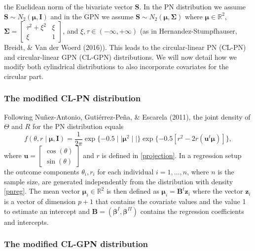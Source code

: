 \documentclass[12pt,]{article}
\DeclareRobustCommand{\VANDER}[3]{#2}
\begin{document}
the Euclidean norm of the bivariate vector \(\boldsymbol{S}\). In the PN
distribution we assume
\(\boldsymbol{S} \sim N_2(\boldsymbol{\mu}, \boldsymbol{I})\) and in the
GPN we assume
\(\boldsymbol{S} \sim N_2(\boldsymbol{\mu}, \boldsymbol{\Sigma})\) where
\(\boldsymbol{\mu} \in \mathbb{R}^2\),
\(\boldsymbol{\Sigma} = \begin{bmatrix} \tau^2 + \xi^2 & \xi\\ \xi & 1 \end{bmatrix}\),
and \(\xi,\tau \in (-\infty, +\infty)\) (as in Hernandez-Stumpfhauser,
Breidt, \& \VANDER{Woerd}{Van der}{van der} Woerd (2016)). This leads to
the circular-linear PN (CL-PN) and circular-linear GPN (CL-GPN)
distributions. We will now detail how we modify both cylindrical
distributions to also incorporate covariates for the circular part.

\subsubsection{The modified CL-PN distribution}

Following Nuñez-Antonio, Gutiérrez-Peña, \& Escarela (2011), the joint
density of \(\Theta\) and \(R\) for the PN distribution equals
\begin{equation}\label{pnreg}
f(\theta,r \mid \boldsymbol{\mu}, \boldsymbol{I}) = \frac{1}{2\pi} \exp\{-0.5 \mid\mid\boldsymbol{\mu}^2\mid\mid\}\exp\{-0.5\left[r^2 -2r(\boldsymbol{u}^t\boldsymbol{\mu}) \right]\},
\end{equation} \noindent where
\(\boldsymbol{u}= \begin{bmatrix} \cos (\theta) \\ \sin (\theta) \end{bmatrix}\)
and \(r\) is defined in \eqref{projection}. In a regression setup the
outcome components \(\theta_i,r_i\) for each individual
\(i = 1, \dots, n\), where \(n\) is the sample size, are generated
independently from the distribution with density \eqref{pnreg}. The mean
vector \(\boldsymbol{\mu}_i \in \mathbb{R}^2\) is then defined as
\(\boldsymbol{\mu}_i = \boldsymbol{B}^t\boldsymbol{z}_i\) where the
vector \(\boldsymbol{z}_i\) is a vector of dimension \(p + 1\) that
contains the covariate values and the value 1 to estimate an intercept
and
\(\boldsymbol{B} = (\boldsymbol{\beta}^{I}, \boldsymbol{\beta}^{II})\)
contains the regression coefficients and intercepts.

\subsubsection{The modified CL-GPN distribution}
\end{document}
